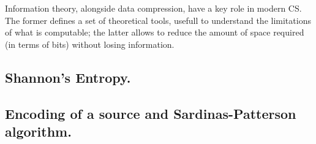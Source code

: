 \documentclass{subfiles}
\begin{document}
    Information theory, alongside data compression,
        have a key role in modern CS. 
        The former defines a set of theoretical tools,
        usefull to understand the limitations of what is computable;
        the latter allows to reduce the amount of space required (in terms of bits)
        without losing information.

    \subsection{Shannon's Entropy.}\label{Sec:1.1}
    

    \subsection{Encoding of a source and Sardinas-Patterson algorithm.}
    
\end{document}

